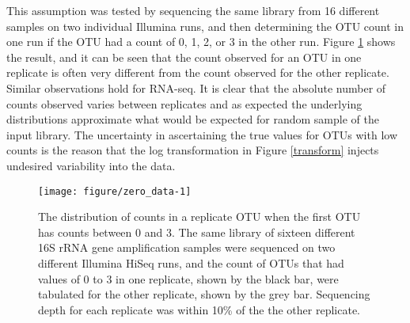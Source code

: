 \documentclass[11pt]{article}\usepackage[]{graphicx}\usepackage[]{color}
\makeatletter
\def\maxwidth{ %
  \ifdim\Gin@nat@width>\linewidth
    \linewidth
  \else
    \Gin@nat@width
  \fi
}
\newenvironment{knitrout}{}{} %
\makeatother
\begin{document}
This assumption was  tested by sequencing the same library from 16 different samples on two individual Illumina runs, and then determining the OTU count in one run if the OTU had a count of 0, 1, 2, or 3 in the other run. Figure \ref{replicate} shows the result, and it can be seen that the count observed for an OTU in one replicate is often very different from the count observed for the other replicate. Similar observations hold for RNA-seq. It is clear that the absolute number of counts observed varies between replicates and as expected the underlying distributions approximate what would be expected for random sample of the input library. The uncertainty in ascertaining the true values for OTUs with low counts is the reason that the log transformation in Figure \ref{transform} injects undesired variability into the data. 
\begin{figure}
\begin{center}

\begin{knitrout}
\color{fgcolor}
\texttt{[image: figure/zero\_data-1]} 

\end{knitrout}
\caption{The distribution of counts in a replicate OTU when the first OTU has counts between 0 and 3. The same library of sixteen different 16S rRNA gene amplification samples were sequenced on two different Illumina HiSeq runs, and the count of OTUs that had values of 0 to 3 in one replicate, shown by the black bar, were tabulated for the other replicate, shown by the grey bar. Sequencing depth for each replicate was within 10\% of the the other replicate. }
\label{replicate}

\end{center}
\end{figure}
\end{document}
